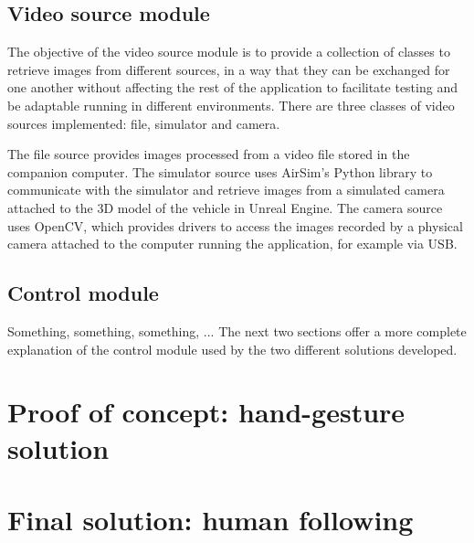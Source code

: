 \subsection{Video source module}

The objective of the video source module is to provide a collection of classes to retrieve images from different sources,
in a way that they can be exchanged for one another without affecting the rest of the application to facilitate testing and be adaptable running in different environments.
There are three classes of video sources implemented: file, simulator and camera.

The file source provides images processed from a video file stored in the companion computer.
The simulator source uses AirSim's Python library to communicate with the simulator and retrieve images from a simulated camera attached to the 3D model of the vehicle in Unreal Engine.
The camera source uses OpenCV, which provides drivers to access the images recorded by a physical camera attached to the computer running the application, for example via USB.

\subsection{Control module}
Something, something, something, ... The next two sections offer a more complete explanation of the control module used by the two different solutions developed.



\section{Proof of concept: hand-gesture solution}

\section{Final solution: human following}



\cleardoublepage